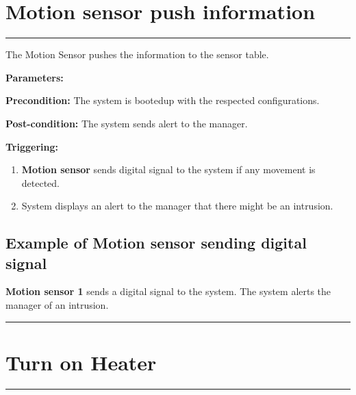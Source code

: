\section{Motion sensor push information}

\hrule
\hfill
\vspace{0.5cm}
\label{operation:Motion sensor push information}

The Motion Sensor pushes the information to the sensor table.
\begin{description}
\item \textbf{Parameters:} \
\item \textbf{Precondition:} The system is bootedup with the respected
configurations.
\item \textbf{Post-condition:} The system sends alert to the manager.

\item \textbf{Triggering:}
\begin{enumerate}
\item \textbf{Motion sensor} sends digital signal to the system if any movement
is detected.
\item System displays an alert to the manager that there might be an intrusion.
\end{enumerate}
\end{description}

\subsection{Example of Motion sensor sending digital signal}
\textbf{Motion sensor 1} sends a digital signal to the system. The system alerts
the manager of an intrusion.
\hfill
\vspace{0.5cm}
\hrule

\break



\section{Turn on Heater}

\hrule
\hfill
\vspace{0.5cm}
\label{operation:Turn on heater}


